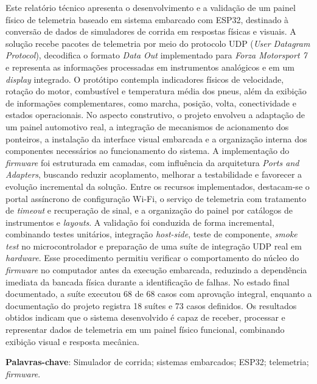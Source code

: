 \documentclass[
  12pt,
  oneside,
  a4paper,
  chapter=TITLE,
  section=TITLE,
  subsection=TITLE,
  brazil
]{abntex2}
\renewcommand{\texttt}[1]{\begingroup\ttfamily\seqsplit{#1}\endgroup}
\newcommand{\estrangeirismo}[1]{\textit{#1}}
\begin{document}
\begin{resumo}
Este relatório técnico apresenta o desenvolvimento e a validação de um painel físico de telemetria baseado em sistema embarcado com ESP32, destinado à conversão de dados de simuladores de corrida em respostas físicas e visuais. A solução recebe pacotes de telemetria por meio do protocolo UDP (\estrangeirismo{User Datagram Protocol}), decodifica o formato \estrangeirismo{Data Out} implementado para \estrangeirismo{Forza Motorsport 7} e representa as informações processadas em instrumentos analógicos e em um \estrangeirismo{display} integrado. O protótipo contempla indicadores físicos de velocidade, rotação do motor, combustível e temperatura média dos pneus, além da exibição de informações complementares, como marcha, posição, volta, conectividade e estados operacionais. No aspecto construtivo, o projeto envolveu a adaptação de um painel automotivo real, a integração de mecanismos de acionamento dos ponteiros, a instalação da interface visual embarcada e a organização interna dos componentes necessários ao funcionamento do sistema. A implementação do \estrangeirismo{firmware} foi estruturada em camadas, com influência da arquitetura \estrangeirismo{Ports and Adapters}, buscando reduzir acoplamento, melhorar a testabilidade e favorecer a evolução incremental da solução. Entre os recursos implementados, destacam-se o portal assíncrono de configuração Wi-Fi, o serviço de telemetria com tratamento de \estrangeirismo{timeout} e recuperação de sinal, e a organização do painel por catálogos de instrumentos e \estrangeirismo{layouts}. A validação foi conduzida de forma incremental, combinando testes unitários, integração \estrangeirismo{host-side}, teste de componente, \estrangeirismo{smoke test} no microcontrolador e preparação de uma suíte de integração UDP real em \estrangeirismo{hardware}. Esse procedimento permitiu verificar o comportamento do núcleo do \estrangeirismo{firmware} no computador antes da execução embarcada, reduzindo a dependência imediata da bancada física durante a identificação de falhas. No estado final documentado, a suíte \texttt{test\_native} executou 68 de 68 casos com aprovação integral, enquanto a documentação do projeto registra 18 suítes e 73 casos definidos. Os resultados obtidos indicam que o sistema desenvolvido é capaz de receber, processar e representar dados de telemetria em um painel físico funcional, combinando exibição visual e resposta mecânica.\par\vspace{\onelineskip}

\textbf{Palavras-chave}: Simulador de corrida; sistemas embarcados; ESP32; telemetria; \estrangeirismo{firmware}.
\end{resumo}
\end{document}
